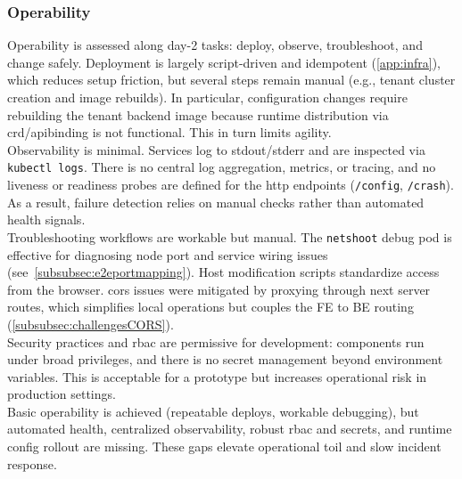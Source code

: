 \documentclass[11pt, a4paper, oneside, listof=totoc]{scrartcl}
\begin{document}
            \subsubsection{Operability}\label{subsubsec:evalOperability}
                Operability is assessed along day-2 tasks: deploy, observe, troubleshoot, and change
                safely.
                Deployment is largely script-driven and idempotent (\autoref{app:infra}), which
                reduces setup friction, but several steps remain manual (e.g., tenant cluster
                creation and image rebuilds).
                In particular, configuration changes require rebuilding the tenant backend image
                because runtime distribution via \gls{crd}/\gls{apibinding} is not functional.
                This in turn limits agility.\\
                Observability is minimal. Services log to stdout/stderr and are inspected via
                \texttt{kubectl logs}.
                There is no central log aggregation, metrics, or tracing, and no liveness or
                readiness probes are defined for the \gls{http} endpoints
                (\texttt{/config}, \texttt{/crash}).
                As a result, failure detection relies on manual checks rather than automated health
                signals.\\
                Troubleshooting workflows are workable but manual. The \texttt{netshoot} debug pod
                is effective for diagnosing node port and service wiring issues
                (see~\autoref{subsubsec:e2eportmapping}).
                Host modification scripts standardize access from the browser.
                \gls{cors} issues were mitigated by proxying through \gls{next} server routes, which
                simplifies local operations but couples the FE to BE routing
                (\autoref{subsubsec:challengesCORS}).\\
                Security practices and \gls{rbac} are permissive for development: components run
                under broad privileges, and there is no secret management beyond environment
                variables.
                This is acceptable for a prototype but increases operational risk in production
                settings.\\
                Basic operability is achieved (repeatable deploys, workable debugging), but
                automated health, centralized observability, robust \gls{rbac} and secrets, and
                runtime config rollout are missing.
                These gaps elevate operational toil and slow incident response.
\end{document}
